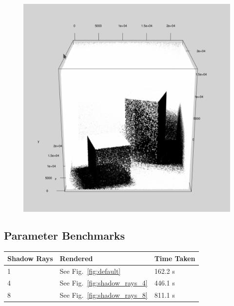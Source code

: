 \documentclass[a4paper, twocolumn]{article}
\begin{document}
            \begin{figure}[H]
                \centering
                \includegraphics[width=0.8\linewidth]{share/photon_map.png}
                \label{fig:photon_map}
            \end{figure}

        \subsection*{Parameter Benchmarks}

            \begin{table}[H]
            \centering
            \begin{tabular}{lll}
                \toprule
                \textbf{Shadow Rays}&\textbf{Rendered}&\textbf{Time Taken}\\
                \midrule
                1&See Fig.~\ref{fig:default}&162.2 s\\
                4&See Fig.~\ref{fig:shadow_rays_4}&446.1 s\\
                8&See Fig.~\ref{fig:shadow_rays_8}&811.1 s\\
                \bottomrule
            \end{tabular}
            \label{tab:shadow_rays}
            \end{table}
\end{document}
